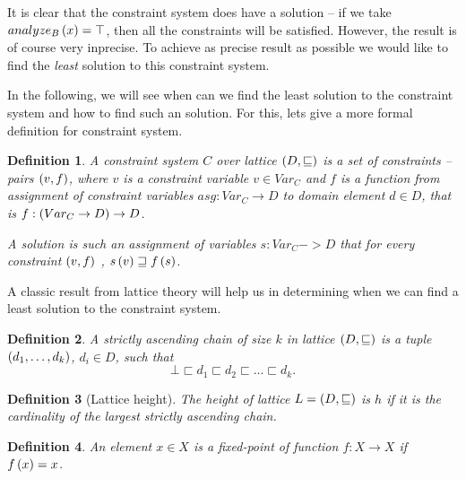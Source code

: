\documentclass[..thesis.tex]{subfiles}
\newtheorem{defin}{Definition}[section]
\begin{document}

It is clear that the constraint system does have a solution -- if we take $analyze_B \left( x \right) = \top$, then all the constraints will be satisfied. However, the result is of course very inprecise. To achieve as precise result as possible we  would like to find the \textit{least} solution to this constraint system. 

In the following, we will see when can we find the least solution to the constraint system and how to find such an solution. For this, lets give a more formal definition for constraint system.

\begin{defin}
A \textit{constraint system} $C$ over lattice $\left( D, \sqsubseteq \right)$ is a set of \textit{constraints} -- pairs $\left( v, f \right)$, where $v$ is a constraint variable $v \in Var_C$ and $f$ is a function from assignment of constraint variables $asg: Var_C \to D$ to domain element $d \in D$, that is $f : \left( Var_C \to D \right) \to D$.

A \textit{solution} is such an assignment of variables $s : Var_C -> D$ that for every constraint $\left( v, f \right)$ , $ s \left( v \right) \sqsupseteq f \left( s \right)$. 
\end{defin}

A classic result from lattice theory will help us in determining when we can find a least solution to the constraint system.

\begin{defin}
  A \textit{strictly ascending chain} of size $k$ in lattice $\left( D, \sqsubseteq \right)$ is a tuple $\left( d_1, \ldots, d_k \right)$, $d_i \in D$, such that
  \begin{equation*}
    \bot \sqsubset d_1 \sqsubset d_2 \sqsubset \ldots \sqsubset d_k \text{.}
  \end{equation*}
\end{defin}

\begin{defin}[Lattice height]
  The \textit{height} of lattice $L=\left( D, \sqsubseteq \right)$ is $h$  if it is the cardinality of the largest strictly ascending chain.
\end{defin}

\begin{defin}
  An element $x \in X$ is a  \textit{fixed-point} of function  $f : X \to X$ if $ f \left( x \right) = x$.
\end{defin}
\end{document}
